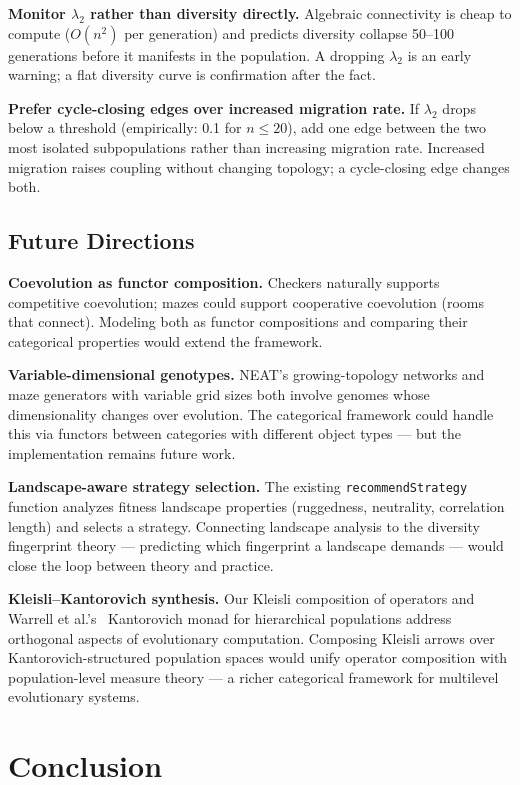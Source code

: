 \documentclass[10pt]{article}
\begin{document}
\textbf{Monitor $\lambda_2$ rather than diversity directly.} Algebraic connectivity is cheap to compute ($O(n^2)$ per generation) and predicts diversity collapse 50--100 generations before it manifests in the population. A dropping $\lambda_2$ is an early warning; a flat diversity curve is confirmation after the fact.

\textbf{Prefer cycle-closing edges over increased migration rate.} If $\lambda_2$ drops below a threshold (empirically: 0.1 for $n \leq 20$), add one edge between the two most isolated subpopulations rather than increasing migration rate. Increased migration raises coupling without changing topology; a cycle-closing edge changes both.

\subsection{Future Directions}

\textbf{Coevolution as functor composition.} Checkers naturally supports competitive coevolution; mazes could support cooperative coevolution (rooms that connect). Modeling both as functor compositions and comparing their categorical properties would extend the framework.

\textbf{Variable-dimensional genotypes.} NEAT's growing-topology networks and maze generators with variable grid sizes both involve genomes whose dimensionality changes over evolution. The categorical framework could handle this via functors between categories with different object types --- but the implementation remains future work.

\textbf{Landscape-aware strategy selection.} The existing \texttt{recommendStrategy} function analyzes fitness landscape properties (ruggedness, neutrality, correlation length) and selects a strategy. Connecting landscape analysis to the diversity fingerprint theory --- predicting which fingerprint a landscape demands --- would close the loop between theory and practice.

\textbf{Kleisli--Kantorovich synthesis.} Our Kleisli composition of operators and Warrell et al.'s~\cite{warrell2024} Kantorovich monad for hierarchical populations address orthogonal aspects of evolutionary computation. Composing Kleisli arrows over Kantorovich-structured population spaces would unify operator composition with population-level measure theory --- a richer categorical framework for multilevel evolutionary systems.

\section{Conclusion}
\end{document}
